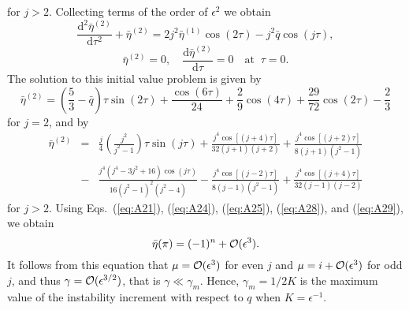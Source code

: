 \documentclass[12pt]{ociamthesis}
\begin{document}
%
for $j > 2$. Collecting terms of the order of $\epsilon^2$ we obtain
%
\begin{equation}
\frac{\mathrm{d}^2\bar\eta^{(2)}}{\mathrm{d}\tau^2} + \bar\eta^{(2)} = 
   2j^2\bar\eta^{(1)}\cos(2\tau) - j^2\bar q\cos(j\tau),
\label{eq:A26} 
\end{equation}
% 
\begin{equation}
\bar\eta^{(2)} = 0, \quad \frac{\mathrm{d}\bar\eta^{(2)}}{\mathrm{d}\tau} = 0 
   \quad \mbox{at} \;\; \tau = 0.
\label{eq:A27}
\end{equation}
%
The solution to this initial value problem is given by
% 
\begin{equation}
\bar\eta^{(2)} = \left(\frac53 - \bar q\right)\tau\sin(2\tau) + 
   \frac{\cos(6\tau)}{24} + \frac29\cos(4\tau) + 
   \frac{29}{72}\cos(2\tau) - \frac23
\label{eq:A28}
\end{equation}
%
for $j = 2$, and by
% 
\begin{eqnarray}
\bar\eta^{(2)} &=& \frac j4\left(\frac{j^2}{j^2 - 1}\right)\tau\sin(j\tau) + 
   \frac{j^4\cos[(j+4)\tau]}{32(j+1)(j+2)} + 
   \frac{j^4\cos[(j+2)\tau]}{8(j+1)(j^2 - 1)}\nonumber\\ 
&-& \frac{j^4(j^4 - 3j^2 + 16)\cos(j\tau)}{16(j^2 - 1)^2(j^2 - 4)} -
   \frac{j^4\cos[(j-2)\tau]}{8(j-1)(j^2 - 1)} + \frac{j^4\cos[(j+4)\tau]}{32(j-1)(j-2)}
\label{eq:A29}
\end{eqnarray}
% 
for $j > 2$. Using Eqs.~(\ref{eq:A21}), (\ref{eq:A24}), (\ref{eq:A25}), (\ref{eq:A28}), and (\ref{eq:A29}), we obtain
% 
\begin{equation}
\bar\eta(\pi) = (-1)^n + {\cal O}(\epsilon^3).
\label{eq:A30}
\end{equation}
%
It follows from this equation that $\mu = {\cal O}(\epsilon^3)$ for even $j$ and $\mu = i + {\cal O}(\epsilon^3)$ for odd $j$\/, and thus $\gamma = {\cal O}(\epsilon^{3/2})$, that is $\gamma \ll \gamma_m$\/.
Hence, $\gamma_m = 1/2K$ is the maximum value of the instability increment with respect to $q$ when $K = \epsilon^{-1}$\/. 



  
\end{document}
